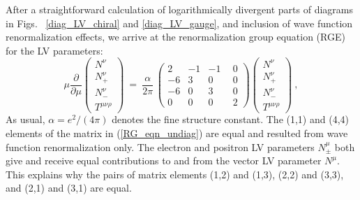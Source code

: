 \documentclass[12pt]{revtex4}
\begin{document}
After a straightforward calculation of logarithmically divergent parts
of diagrams in Figs. ~\ref{diag_LV_chiral} and \ref{diag_LV_gauge},
and inclusion of wave function renormalization effects, we arrive at
the renormalization group equation (RGE) for the LV parameters: 
\begin{equation}
\label{RG_eqn_undiag}
     \mu \frac{\partial}
              {\partial\mu} 
                \left(
\begin{array}{c}
                   N^\nu \\ 
   N_+^\nu \\
                   N_{-}^\nu \\
   T^{\mu\nu\rho}
                \end{array} \right) ~=~  
     \frac{\alpha}
          {2 \pi} \, 
     \left(\begin{array}{rrrr}
                    2 & -1 & -1 & ~~0 \\
   -6 &  3 &  0 & ~~0 \\
                   -6 &  0 &  3 & ~~0 \\
    0 &  0 &  0 & ~~2
           \end{array}\right)
     \left(
  \begin{array}{c}
                 N^\nu \\ 
 N_+^\nu \\
                 N_{-}^\nu \\
 T^{\mu\nu\rho}
          \end{array} \right)~,
\end{equation}
%
As usual, $\alpha = e^2/(4\pi)$ denotes the fine structure constant. 
The (1,1) and (4,4) elements of the matrix in (\ref{RG_eqn_undiag})
are equal and  resulted from wave function renormalization only.
The electron and positron LV parameters $N_\pm^\mu$ both give and
receive equal contributions to and from the vector LV parameter
$N^\mu$. This explains why the pairs of matrix elements (1,2) and (1,3),
(2,2) and (3,3), and (2,1) and (3,1) are equal.  
\end{document}
